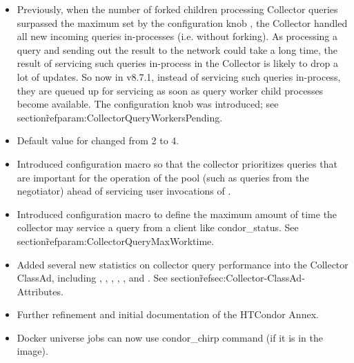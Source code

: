 \begin{itemize}

\item Previously, when the number of forked children processing Collector
queries surpassed the maximum set by the configuration knob , the
Collector handled all new incoming queries in-processes (i.e. without
forking). As processing a query and sending out the result to the network
could take a long time, the result of servicing such queries in-process in
the Collector is likely to drop a lot of updates. So now in v8.7.1, instead of
servicing such queries in-process, they are queued up for servicing as soon as
query worker child processes become available.  The configuration knob
 was introduced; see
section\~ref{param:CollectorQueryWorkersPending}.

\item Default value for  changed from 2 to 4.

\item Introduced configuration macro
 so that the
collector prioritizes queries that are important for the operation of the
pool (such as queries from the negotiator) ahead of servicing user
invocations of .

\item Introduced configuration macro  to
define the maximum amount of time the collector may service a query from a
client like condor\_status.  See section\~ref{param:CollectorQueryMaxWorktime}.

\item Added several new statistics on collector query performance into the Collector
ClassAd, including , ,
, , ,
and .  See section\~ref{sec:Collector-ClassAd-Attributes}.

\item Further refinement and initial documentation of the HTCondor Annex.

\item Docker universe jobs can now use condor\_chirp command
(if it is in the image).


\end{itemize}
